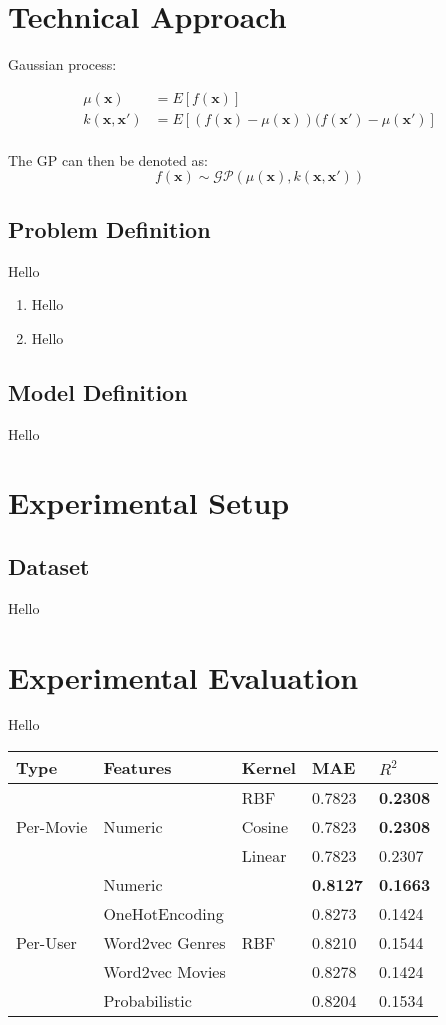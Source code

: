 \documentclass[a4paper]{article}
\theoremstyle{genius}
\begin{document}
\section{Technical Approach}
Gaussian process:

\begin{align*}
	\mu(\textbf{x}) &= E[f(\textbf{x})] \\
	k(\textbf{x}, \textbf{x}') &= E[(f(\textbf{x}) - \mu(\textbf{x}))(f(\textbf{x}') - \mu(\textbf{x}')] \\
\end{align*}

The GP can then be denoted as:
\[f(\textbf{x}) \sim \mathcal{GP}(\mu(\textbf{x}), k(\textbf{x}, \textbf{x}'))\]

\subsection{Problem Definition}
Hello

\begin{enumerate}
	\item Hello
	\item Hello
\end{enumerate}

\subsection{Model Definition}
Hello

\section{Experimental Setup}
\subsection{Dataset}
Hello

\section{Experimental Evaluation}
Hello 
\begin{center}
	\begin{tabular}{lllll}
		\hline
		Type & Features & Kernel & MAE & $R^{2}$ \\
		\hline
		\multirow{3}{*}{Per-Movie} &\multirow{3}{*}{Numeric}
		 & RBF & 0.7823 & \textbf{0.2308}\\
		& & Cosine & 0.7823 & \textbf{0.2308} \\
		& & Linear & 0.7823 & 0.2307 \\
		\hline
		\multirow{5}{*}{Per-User} & Numeric & \multirow{5}{*}{RBF} & \textbf{0.8127} & \textbf{0.1663} \\
		& OneHotEncoding & & 0.8273 & 0.1424 \\
		& Word2vec Genres & & 0.8210 & 0.1544 \\
		& Word2vec Movies & & 0.8278 & 0.1424 \\
		& Probabilistic   & & 0.8204 & 0.1534\\
		\hline
	\end{tabular}
\end{center}
\end{document}
